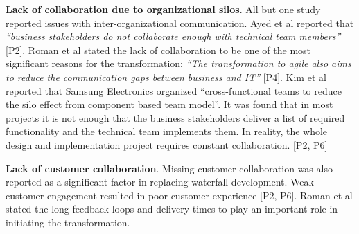 {\bfseries Lack of collaboration due to organizational silos}. All but
one study reported issues with inter-organizational communication. Ayed
et al reported that \textit{``business stakeholders do not collaborate
enough with technical team members''} [P2]. Roman et al stated the
lack of collaboration to be one of the most significant reasons for
the transformation: \textit{``The transformation to agile also aims
to reduce the communication gaps between business and IT''} [P4]. Kim
et al reported that Samsung Electronics organized ``cross-functional
teams to reduce the silo effect from component based team model''. It
was found that in most projects it is not enough that the business
stakeholders deliver a list of required functionality and the technical
team implements them. In reality, the whole design and implementation
project requires constant collaboration. [P2, P6]

{\bfseries Lack of customer collaboration}. Missing customer
collaboration was also reported as a significant factor in replacing
waterfall development. Weak customer engagement resulted in poor
customer experience [P2, P6]. Roman et al stated the long feedback
loops and delivery times to play an important role in initiating the
transformation.
